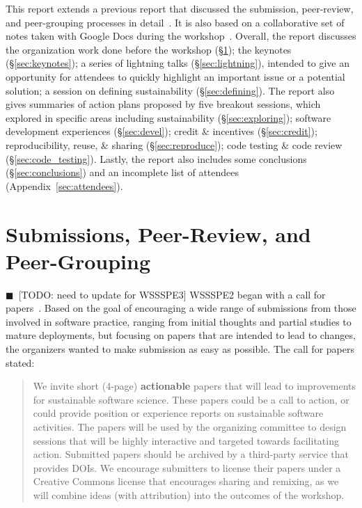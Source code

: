\documentclass[11pt, oneside]{amsart}
\newcommand{\todo}[1]{{\color{blue}$\blacksquare$~\textsf{[TODO: #1]}}}
\newcommand{\note}[1]{ {\textcolor{blueish}    { ***Note:      #1 }}}
\begin{document}
This report extends a previous report that discussed the submission,
peer-review, and peer-grouping processes in detail~\cite{WSSSPE2-pre-report}. It
is also based on a collaborative set of notes taken with Google Docs during the
workshop~\cite{WSSSPE2-google-notes}. Overall, the report discusses the
organization work done before the workshop (\S\ref{sec:preworkshop}); the
keynotes (\S\ref{sec:keynotes}); a series of lightning talks
(\S\ref{sec:lightning}), intended to give an opportunity for attendees to
quickly highlight an important issue or a potential solution; a session on
defining sustainability (\S\ref{sec:defining}). The report also gives summaries
of action plans proposed by five breakout sessions, which explored in specific
areas including sustainability (\S\ref{sec:exploring}); software development
experiences (\S\ref{sec:devel}); credit \& incentives (\S\ref{sec:credit});
reproducibility, reuse, \& sharing (\S\ref{sec:reproduce}); code testing \& code
review (\S\ref{sec:code_testing}). Lastly, the report also includes some
conclusions (\S\ref{sec:conclusions}) and an incomplete list of attendees
(Appendix~\ref{sec:attendees}).



\section{Submissions, Peer-Review, and Peer-Grouping} \label{sec:preworkshop}


\todo{need to update for WSSSPE3}
WSSSPE2 began with a call for papers~\cite{WSSSPE2-pre-report}. Based on the
goal of encouraging a wide range of submissions from those involved in software
practice, ranging from initial thoughts and partial studies to mature
deployments, but focusing on papers that are intended to lead to changes, the
organizers wanted to make submission as easy as possible. The call for papers
stated:

\begin{quote} We invite short (4-page) \textbf{actionable} papers that will lead
to improvements for sustainable software science. These papers could be a call
to action, or could provide position or experience reports on sustainable
software activities. The papers will be used by the organizing committee to
design sessions that will be highly interactive and targeted towards
facilitating action. Submitted papers should be archived by a third-party
service that provides DOIs. We encourage submitters to license their papers
under a Creative Commons license that encourages sharing and remixing, as we
will combine ideas (with attribution) into the outcomes of the workshop.
\end{quote}
\end{document}
